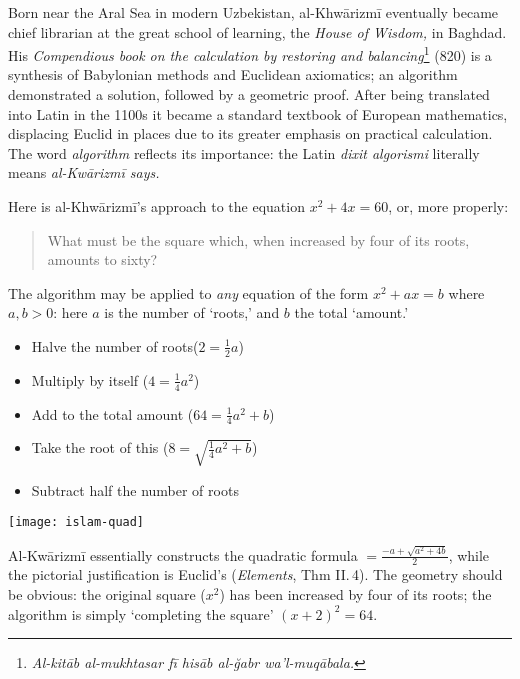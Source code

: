 	
Born near the Aral Sea in modern Uzbekistan, al-Khwārizmī eventually became chief librarian at the great school of learning, the \emph{House of Wisdom,} in Baghdad. His \emph{Compendious book on the calculation by restoring and balancing}\footnote{\emph{Al-kitāb al-mukhtasar fī hisāb al-ğabr wa’l-muqābala.}} (820) is a synthesis of Babylonian methods and Euclidean axiomatics; an algorithm demonstrated a solution, followed by a geometric proof. After being translated into Latin in the 1100s it became a standard textbook of European mathematics, displacing Euclid in places due to its greater emphasis on practical calculation. The word \emph{algorithm} reflects its importance: the Latin \emph{dixit algorismi} literally means \emph{al-Kwārizmī says.}


\begin{example*}{}{}
	Here is al-Khwārizmī's approach to the equation $x^2+4x=60$, or, more properly:
	\begin{quote}
		What must be the square which, when increased by four of its roots, amounts to sixty?
	\end{quote}
	
	\begin{minipage}[t]{0.7\linewidth}\vspace{-10pt}
		The algorithm may be applied to \emph{any} equation of the form $x^2+ax=b$ where $a,b>0$: here $a$ is the number of `roots,' and $b$ the total `amount.'
		\begin{itemize}\itemsep0pt
		  \item Halve the number of roots\hfill \big($2=\frac 12a$\big)
		  \item Multiply by itself \hfill \big($4=\frac 14a^2$\big)
		  \item Add to the total amount \hfill \big($64=\frac 14a^2+b$\big)
		  \item Take the root of this \hfill \Big($8=\sqrt{\frac 14a^2+b}$\Big)
		  \item Subtract half the number of roots \hfill {}
		\end{itemize}
	\end{minipage}
	\hfill
	\begin{minipage}[t]{0.29\linewidth}\vspace{-3pt}
		\flushright
		\texttt{[image: islam-quad]}
	\end{minipage}
	\smallbreak
	Al-Kwārizmī essentially constructs the quadratic formula $=\frac{-a+\sqrt{a^2+4b}}2$, while the pictorial justification is Euclid's (\emph{Elements}, Thm II.\,4). The geometry should be obvious: the original square ($x^2$) has been increased by four of its roots; the algorithm is simply `completing the square' $(x+2)^2=64$.
\end{example*}

